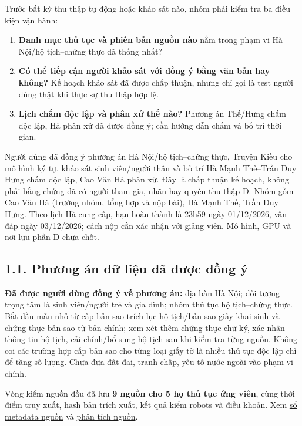 \documentclass[11pt,a4paper]{article}
\providecommand{\tightlist}{\setlength{\itemsep}{0pt}\setlength{\parskip}{0pt}}
\begin{document}
Trước bất kỳ thu thập tự động hoặc khảo sát nào, nhóm phải kiểm tra ba
điều kiện vận hành:

\begin{enumerate}
\def\labelenumi{\arabic{enumi}.}
\tightlist
\item
  \textbf{Danh mục thủ tục và phiên bản nguồn nào} nằm trong phạm vi Hà
  Nội/hộ tịch--chứng thực đã thống nhất?
\item
  \textbf{Có thể tiếp cận người khảo sát với đồng ý bằng văn bản hay
  không?} Kế hoạch khảo sát đã được chấp thuận, nhưng chỉ gọi là test
  người dùng thật khi thực sự thu thập hợp lệ.
\item
  \textbf{Lịch chấm độc lập và phân xử thế nào?} Phương án Thế/Hưng chấm
  độc lập, Hà phân xử đã được đồng ý; cần hướng dẫn chấm và bố trí thời
  gian.
\end{enumerate}

Người dùng đã đồng ý phương án Hà Nội/hộ tịch--chứng thực, Truyện Kiều
cho mô hình ký tự, khảo sát sinh viên/người thân và bố trí Hà Mạnh
Thế--Trần Duy Hưng chấm độc lập, Cao Văn Hà phân xử. Đây là chấp thuận
kế hoạch, không phải bằng chứng đã có người tham gia, nhãn hay quyền thu
thập D. Nhóm gồm Cao Văn Hà (trưởng nhóm, tổng hợp và nộp bài), Hà Mạnh
Thế, Trần Duy Hưng. Theo lịch Hà cung cấp, hạn hoàn thành là 23h59 ngày
01/12/2026, vấn đáp ngày 03/12/2026; cách nộp cần xác nhận với giảng
viên. Mô hình, GPU và nơi lưu phần D chưa chốt.

\subsection{1.1. Phương án dữ liệu đã được đồng
ý}\label{phux1b0ux1a1ng-uxe1n-dux1eef-liux1ec7u-ux111uxe3-ux111ux1b0ux1ee3c-ux111ux1ed3ng-uxfd}

\textbf{Đã được người dùng đồng ý về phương án:} địa bàn Hà Nội; đối
tượng trọng tâm là sinh viên/người trẻ và gia đình; nhóm thủ tục hộ
tịch--chứng thực. Bắt đầu mẫu nhỏ từ cấp bản sao trích lục hộ tịch/bản
sao giấy khai sinh và chứng thực bản sao từ bản chính; xem xét thêm
chứng thực chữ ký, xác nhận thông tin hộ tịch, cải chính/bổ sung hộ tịch
sau khi kiểm tra từng nguồn. Không coi các trường hợp cấp bản sao cho
từng loại giấy tờ là nhiều thủ tục độc lập chỉ để tăng số lượng. Chưa
đưa đất đai, tranh chấp, yếu tố nước ngoài vào phạm vi chính.

Vòng kiểm nguồn đầu đã lưu \textbf{9 nguồn cho 5 họ thủ tục ứng viên},
cùng thời điểm truy xuất, hash bản trích xuất, kết quả kiểm robots và
điều khoản. Xem \href{../data/source-ledger.json}{sổ metadata nguồn} và
\href{../data/source-audit.md}{phân tích nguồn}.
\end{document}
